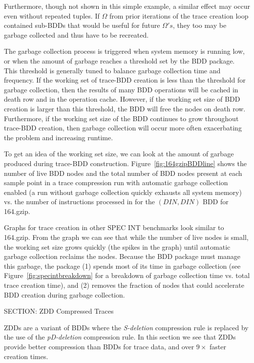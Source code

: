 {Furthermore, though not shown in this simple example, a similar effect may occur even without repeated tuples.  If $\Omega$ from prior iterations of the trace creation loop contained sub-BDDs that would be useful for future $\Omega's$, they too may be garbage collected and thus have to be recreated.

The garbage collection process is triggered when system memory is running low, or when the amount of garbage reaches a threshold set by the BDD package.  This threshold is generally tuned to balance garbage collection time and frequency.  If the working set of trace-BDD creation is less than the threshold for garbage collection, then the results of many BDD operations will be cached in death row and in the operation cache.  However, if the working set size of BDD creation is larger than this threshold, the BDD will free the nodes on death row. Furthermore, if the working set size of the BDD continues to grow throughout trace-BDD creation, then garbage collection will occur more often exacerbating the problem and increasing runtime.

To get an idea of the working set size, we can look at the amount of garbage produced during trace-BDD construction. Figure~\ref{fig:164gzipBDDline} shows the number of live BDD nodes and the total number of BDD nodes present at each sample point in a trace compression run with automatic garbage collection enabled (a run without garbage collection quickly exhausts all system memory) vs. the number of instructions processed in for the $(DIN,DIN)$ BDD for 164.gzip.

Graphs for trace creation in other SPEC INT benchmarks look similar to 164.gzip.  From the graph we can see that while the number of live nodes is small, the working set size grows quickly (the spikes in the graph) until automatic garbage collection reclaims the nodes.  Because the BDD package must manage this garbage, the package (1) spends most of its time in garbage collection (see Figure~\ref{fig:specintbreakdown} for a breakdown of garbage collection time vs. total trace creation time), and (2) removes the fraction of nodes that could accelerate BDD creation during garbage collection.

SECTION: ZDD Compressed Traces


ZDDs are a variant of BDDs where the \textit{S-deletion} compression rule is replaced by the use of the \textit{pD-deletion} compression rule.  In this section we see that ZDDs provide better compression than BDDs for trace data, and over $9\times$ faster creation times.

}
